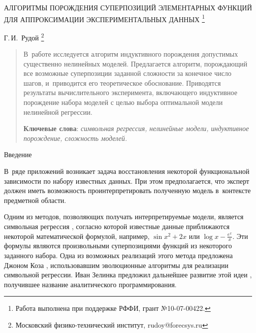 \documentclass[12pt,a4paper]{article}
\makeatletter
\renewcommand{\section}{\@startsection {section}{1}
  \z@{2.7ex \@plus 1ex}{1.0ex}%
  {\normalfont}}
\makeatother
\begin{document}
\pagestyle{plain}
\lstset{language=C++}

\begin{center}
  АЛГОРИТМЫ ПОРОЖДЕНИЯ СУПЕРПОЗИЦИЙ ЭЛЕМЕНТАРНЫХ ФУНКЦИЙ ДЛЯ АППРОКСИМАЦИИ ЭКСПЕРИМЕНТАЛЬНЫХ ДАННЫХ
	\footnote{Работа выполнена при поддержке РФФИ, грант №10-07-00422.}

  \bigskip
  Г.\,И.~Рудой \footnote{Московский физико-технический институт, rudoy@forecsys.ru}
\end{center}

\begin{abstract}
  В~работе
  исследуется алгоритм индуктивного порождения допустимых существенно
  нелинейных моделей. Предлагается алгоритм, порождающий все возможные
  суперпозиции заданной сложности за конечное число шагов, и~приводится его
  теоретическое обоснование. Приводятся результаты вычислительного
  эксперимента, включающего индуктивное порождение набора моделей
  с целью выбора оптимальной модели нелинейной регрессии.

  \bigskip
  \textbf{Ключевые слова}: \emph{символьная регрессия, нелинейные модели, индуктивное порождение,
	сложность моделей.}
\end{abstract}

\section{Введение}

В~ряде приложений \cite{duffy:1999:srised,Barmpalexis201175}
возникает задача восстановления некоторой функциональной зависимости по набору известных данных.
При этом предполагается, что эксперт должен иметь возможность
проинтерпретировать полученную модель в~контексте предметной области.

Одним из методов, позволяющих получать интерпретируемые модели, является
символьная регрессия \cite{davidson:2000:snrea,reference/ml/X10vc,StrijovW10,Strijov08InductMethods},
согласно которой известные данные приближаются некоторой математической
формулой, например, $ \sin x^2 + 2x $ или $\log x - \frac{e^x}{x} $.
Эти формулы являются произвольными суперпозициями функций из некоторого
заданного набора. Одна из возможных реализаций этого метода
предложена Джоном Коза \cite{Koza1998GP, Koza1998Intro}, использовавшим
эволюционные алгоритмы для реализации символьной регрессии. Иван Зелинка
предложил дальнейшее развитие этой идеи \cite{Zelinka2008}, получившее
название аналитического программирования.
\end{document}
